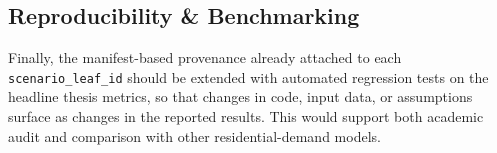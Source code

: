 \subsection{Reproducibility \& Benchmarking}
\label{sec:futureworkReproducibility}

Finally, the manifest-based provenance already attached to each
\texttt{scenario\_leaf\_id} should be extended with automated regression tests on
the headline thesis metrics, so that changes in code, input data, or assumptions
surface as changes in the reported results. This would support both academic
audit and comparison with other residential-demand models.









